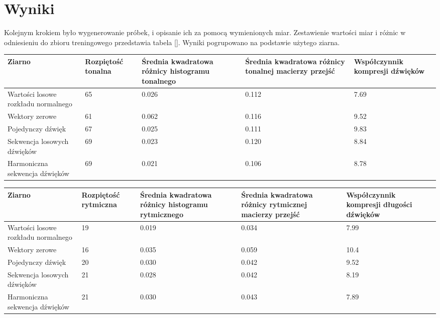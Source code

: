 {    \section{Wyniki}
    {
        Kolejnym krokiem było wygenerowanie próbek, i opisanie ich za pomocą wymienionych miar. Zestawienie wartości miar i różnic
        w odniesieniu do zbioru treningowego przedstawia tabela []. Wyniki pogrupowano na podstawie użytego ziarna.

        \begin{center}
            \begin{tabular}{ |p{2.5cm}|p{2.5cm}|p{2.5cm}|p{2.5cm}|p{2.5cm}| }
            \hline
            Ziarno & Rozpiętość tonalna & Średnia kwadratowa różnicy histogramu tonalnego & Średnia kwadratowa różnicy tonalnej macierzy przejść & Współczynnik kompresji dźwięków \\ 
            \hline
            \hline
            Wartości losowe rozkładu normalnego & 65 & 0.026 & 0.112 & 7.69 \\  
            \hline
            Wektory zerowe & 61 & 0.062 & 0.116 & 9.52 \\
            \hline
            Pojedynczy dźwięk & 67 & 0.025 & 0.111 & 9.83 \\
            \hline
            Sekwencja losowych dźwięków & 69 & 0.023 & 0.120 & 8.84 \\
            \hline
            Harmoniczna sekwencja dźwięków & 69 & 0.021 & 0.106  & 8.78 \\
            \hline
            \end{tabular}
        \end{center}
        
        \begin{center}
            \begin{tabular}{ |p{2.5cm}|p{2.5cm}|p{2.5cm}|p{2.5cm}|p{2.5cm}| }
            \hline
            Ziarno & Rozpiętość rytmiczna & Średnia kwadratowa różnicy histogramu rytmicznego & Średnia kwadratowa różnicy rytmicznej macierzy przejść & Współczynnik kompresji długości dźwięków \\ 
            \hline
            \hline
            Wartości losowe rozkładu normalnego & 19 & 0.019 & 0.034 & 7.99 \\  
            \hline
            Wektory zerowe & 16 & 0.035 & 0.059 & 10.4 \\
            \hline
            Pojedynczy dźwięk & 20 & 0.030 & 0.042 & 9.52 \\
            \hline
            Sekwencja losowych dźwięków & 21 & 0.028 & 0.042 & 8.19 \\
            \hline
            Harmoniczna sekwencja dźwięków & 21 & 0.030 & 0.043 & 7.89 \\
            \hline
            \end{tabular}
        \end{center}

}}
